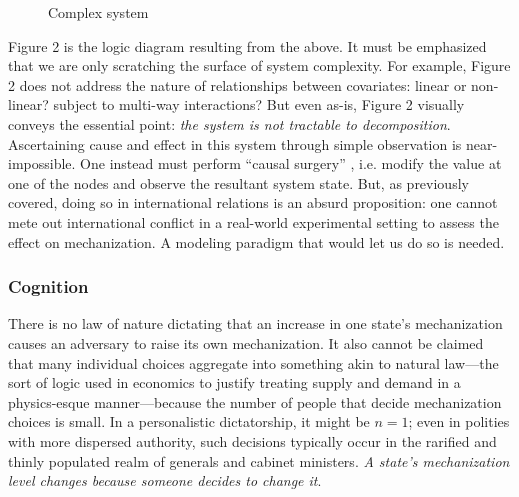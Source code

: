 \documentclass{article}
\begin{document}
\begin{figure}[h]
	\centering
	\caption{Complex system}
\end{figure}

Figure 2 is the logic diagram resulting from the above. It must be emphasized that we are only scratching the 
surface of system complexity. For example, Figure 2 does not address the nature of relationships 
between covariates: linear or non-linear? subject to multi-way
interactions? But even as-is, Figure 2 visually conveys the essential point: \textit{the system is
not tractable to decomposition}. Ascertaining cause and effect in this system through simple observation is 
near-impossible. 
One instead must perform ``causal surgery'' \citep{pearl2009causality}, i.e. modify the value at one
of the nodes and observe the
resultant system state. But, as previously covered, doing so in international relations is an
absurd proposition: one cannot mete out international conflict in a real-world experimental
setting to assess the effect on mechanization. A modeling paradigm that would let us do so is needed.


\subsubsection{Cognition}

There is no law of nature dictating that an increase in one state's mechanization causes an adversary to 
raise its own mechanization. It also cannot be claimed that many individual choices aggregate into something 
akin to natural law---the sort of logic used 
in economics to justify treating supply and demand in a physics-esque manner---because the number of
people that decide mechanization choices is small. In a personalistic
dictatorship, it might be $n=1$; even in polities with more dispersed authority, such decisions
typically occur in the rarified and thinly populated realm of generals and cabinet ministers. 
\textit{A state's mechanization level changes because someone decides to change it}.
\end{document}
